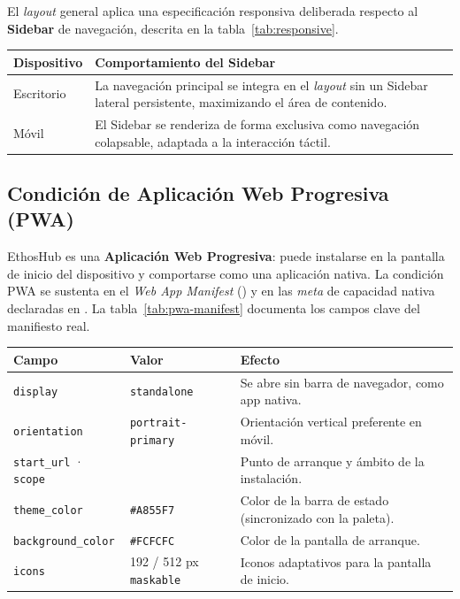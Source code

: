 El \textit{layout} general aplica una especificación responsiva deliberada respecto al
\textbf{Sidebar} de navegación, descrita en la tabla~\ref{tab:responsive}.

\vspace{0.2cm}
\noindent
\renewcommand{\arraystretch}{1.3}
\fontsize{9}{10.8}\selectfont\sffamily
\begin{tabularx}{\textwidth}{|L{2.6cm}|Y|}
\hline
{}
\sffamily\textbf{Dispositivo} & \sffamily\textbf{Comportamiento del Sidebar} \\
\hline
Escritorio & La navegación principal se integra en el \textit{layout} sin un Sidebar lateral persistente, maximizando el área de contenido. \\
\hline
{}
Móvil & El Sidebar se renderiza de forma exclusiva como navegación colapsable, adaptada a la interacción táctil. \\
\hline
\end{tabularx}
\label{tab:responsive}

\subsection{Condición de Aplicación Web Progresiva (PWA)}
\label{subsec:pwa}

EthosHub es una \textbf{Aplicación Web Progresiva}: puede instalarse en la pantalla de
inicio del dispositivo y comportarse como una aplicación nativa. La condición PWA se
sustenta en el \textit{Web App Manifest} () y en
las \textit{meta} de capacidad nativa declaradas en . La
tabla~\ref{tab:pwa-manifest} documenta los campos clave del manifiesto real.

\vspace{0.2cm}
\noindent
\renewcommand{\arraystretch}{1.3}
\fontsize{8.5}{10.2}\selectfont\sffamily
\begin{tabularx}{\textwidth}{|L{3.2cm}|L{3.4cm}|Y|}
\hline
{}
\sffamily\textbf{Campo} & \sffamily\textbf{Valor} & \sffamily\textbf{Efecto} \\
\hline
\texttt{display} & \texttt{standalone} & Se abre sin barra de navegador, como app nativa. \\ \hline
{}
\texttt{orientation} & \texttt{portrait-primary} & Orientación vertical preferente en móvil. \\ \hline
\texttt{start\_url} · \texttt{scope} & \pathbreak{/} & Punto de arranque y ámbito de la instalación. \\ \hline
{}
\texttt{theme\_color} & \texttt{\#A855F7} & Color de la barra de estado (sincronizado con la paleta). \\ \hline
\texttt{background\_color} & \texttt{\#FCFCFC} & Color de la pantalla de arranque. \\ \hline
{}
\texttt{icons} & 192 / 512 px \texttt{maskable} & Iconos adaptativos para la pantalla de inicio. \\ \hline
\end{tabularx}
\label{tab:pwa-manifest}


